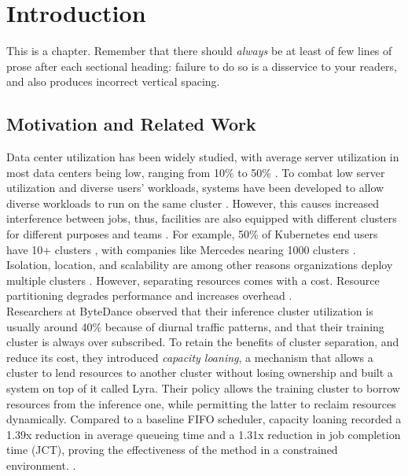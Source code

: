 
\chapter{Introduction}

This is a chapter.  Remember  that there should \emph{always}
be at least of few lines of prose after each sectional heading:
failure to do so is a disservice to your readers, and also
produces incorrect vertical spacing.


\section{Motivation and Related Work}
Data center utilization has been widely studied, with average server utilization in most data centers being low, 
ranging from 10\% to 50\%
\cite{lo_heracles_2015}. 
To combat low server utilization and diverse users' workloads, systems have been developed to allow diverse workloads to run 
on the same cluster \cite{bhattacharya_hierarchical_2013, hindman_mesos_nodate}. 
However, this causes increased interference between jobs, thus, 
facilities are also equipped with different clusters for different purposes and teams \cite{patel_what_2022, li_lyra_2023}. 
For example, 50\% of Kubernetes \cite{borg}
end users have 10+ clusters \cite{noauthor_cncf_2023} 
, with companies like Mercedes nearing 1000 clusters \cite{noauthor_mercedes-benz_2023}.
Isolation, location, and scalability are among other reasons organizations deploy multiple clusters \cite{google-cloud-blog}.
However, separating resources comes with a cost. Resource partitioning degrades performance and increases overhead \cite{adv-dis-mutli}.\\ 
Researchers at ByteDance observed that their inference cluster utilization is usually around 40\% because 
of diurnal traffic patterns, and that their training cluster is always over subscribed. 
To retain the benefits of cluster separation, and reduce its cost, they introduced \textit{capacity loaning}, 
a mechanism that allows a cluster to lend resources to another cluster without losing ownership and built a system on top 
of it called Lyra.
Their policy allows the training cluster to borrow resources from the inference one, while permitting the 
latter to reclaim resources dynamically. 
Compared to a baseline FIFO scheduler, capacity loaning recorded a 1.39x reduction in average queueing time and a 1.31x 
reduction in job completion time (JCT), proving the effectiveness of the method in a constrained environment. \cite{li_lyra_2023}.

